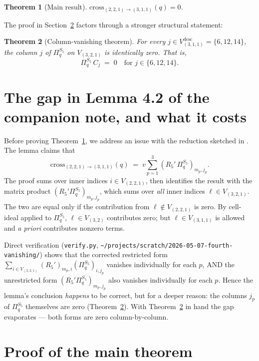 \documentclass[11pt]{article}
\newtheorem{theorem}{Theorem}
\theoremstyle{definition}
\begin{document}
\begin{theorem}[Main result]\label{thm:main}
$\mathrm{cross}_{(2,2,1)\to(3,1,1)}(q) = 0$.
\end{theorem}

The proof in Section~\ref{sec:proof} factors through a stronger structural statement:

\begin{theorem}[Column-vanishing theorem]\label{thm:column}
For every $j \in V_{(3,1,1)}^{\text{desc}} = \{6, 12, 14\}$, the column $j$ of $\Pi_q^{S_5}$ on $V_{(3,2,1)}$ is identically zero. That is,
\[
\Pi_q^{S_5} \, C_j \;=\; 0 \quad \text{for } j \in \{6, 12, 14\}.
\]
\end{theorem}

\section{The gap in Lemma 4.2 of the companion note, and what it costs}\label{sec:gap}

Before proving Theorem~\ref{thm:main}, we address an issue with the reduction sketched in \cite[Lemma~4.2]{cell-ideal}. The lemma claims that
\[
\mathrm{cross}_{(2,2,1)\to(3,1,1)}(q) \;=\; v\sum_{p=1}^{3} (R_5'\,\Pi_q^{S_5})_{m_p, j_p}.
\]
The proof sums over inner indices $i \in V_{(2,2,1)}$, then identifies the result with the matrix product $(R_5'\Pi_q^{S_5})_{m_p, j_p}$, which sums over \emph{all} inner indices $\ell \in V_{(3,2,1)}$. The two are equal only if the contribution from $\ell \notin V_{(2,2,1)}$ is zero. By cell-ideal applied to $\Pi_q^{S_5}$, $\ell \in V_{(3,2)}$ contributes zero; but $\ell \in V_{(3,1,1)}$ is allowed and \emph{a priori} contributes nonzero terms.

Direct verification (\texttt{verify.py}, \texttt{\textasciitilde/projects/scratch/2026-05-07-fourth-vanishing/}) shows that the corrected restricted form $\sum_{i \in V_{(2,2,1)}}(R_5')_{m_p, i}(\Pi_q^{S_5})_{i, j_p}$ vanishes individually for each $p$, AND the unrestricted form $(R_5'\Pi_q^{S_5})_{m_p, j_p}$ also vanishes individually for each $p$. Hence the lemma's conclusion \emph{happens} to be correct, but for a deeper reason: the columns $j_p$ of $\Pi_q^{S_5}$ themselves are zero (Theorem~\ref{thm:column}). With Theorem~\ref{thm:column} in hand the gap evaporates --- both forms are zero column-by-column.

\section{Proof of the main theorem}\label{sec:proof}
\end{document}
